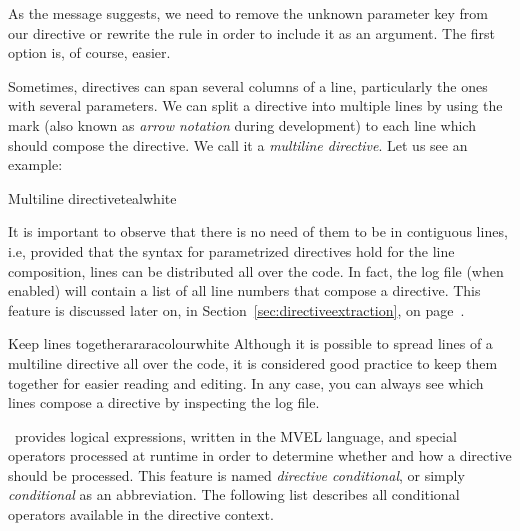 As the message suggests, we need to remove the unknown parameter key from our directive or rewrite the rule in order to include it as an argument. The first option is, of course, easier.

Sometimes, directives can span several columns of a line, particularly the ones with several parameters. We can split a directive into multiple lines by using the  mark (also known as \emph{arrow notation} during development) to each line which should compose the directive. We call it a \emph{multiline directive}. Let us see an example:

\begin{codebox}{Multiline directive}{teal}{\icnote}{white}
\end{codebox}

It is important to observe that there is no need of them to be in contiguous lines, i.e, provided that the syntax for parametrized directives hold for the line composition, lines can be distributed all over the code. In fact, the log file (when enabled) will contain a list of all line numbers that compose a directive. This feature is discussed later on, in Section~\ref{sec:directiveextraction}, on page~\pageref{sec:directiveextraction}.

\begin{messagebox}{Keep lines together}{araracolour}{\icinfo}{white}
Although it is possible to spread lines of a multiline directive all over the code, it is considered good practice to keep them together for easier reading and editing. In any case, you can always see which lines compose a directive by inspecting the log file.
\end{messagebox}

\arara\ provides logical expressions, written in the MVEL language, and special operators processed at runtime in order to determine whether and how a directive should be processed. This feature is named \emph{directive conditional}, or simply \emph{conditional} as an abbreviation. The following list describes all conditional operators available in the directive context.

